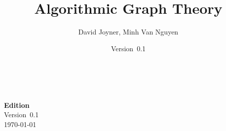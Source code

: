 \documentclass[a4paper,twoside,12pt]{book}
\newcommand{\documentEdition}{0.1}
\begin{document}
\title{\Huge{\bf{Algorithmic Graph Theory}}}
\author{\Large{David Joyner, Minh Van Nguyen}}
\date{Version~\documentEdition}
\maketitle



{\thispagestyle{empty}
   \\\\
  \textbf{Edition} \\
  Version~\documentEdition \\
  \today
}

\frontmatter
\setcounter{tocdepth}{1}
\tableofcontents
\listoffigures
\listoftables

\mainmatter






















\appendix



\backmatter


\printindex
\end{document}
